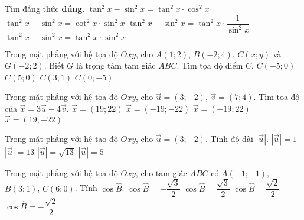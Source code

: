\begin{ex}%
	Tìm đẳng thức \textbf{đúng}.
	\choice
	{$\tan^2 x-\sin^2 x=\tan^2x \cdot \cos^2 x$}
	{$\tan^2 x-\sin^2 x=\cot^2 x\cdot \sin^2 x$}
	{$\tan^2 x-\sin^2 x=\tan^2 x\cdot \dfrac{1}{\sin^2 x}$}
	{\True $\tan^2 x-\sin^2 x=\tan^2x \cdot \sin^2 x$}
\end{ex}
\begin{ex}%
	Trong mặt phẳng với hệ tọa độ $Oxy$, cho $A(1;2)$, $B(-2;4)$, $C(x;y)$ và $G(-2;2)$. Biết $G$ là trọng tâm tam giác $ABC$. Tìm tọa độ điểm $C$.
	\choice
	{\True $C(-5;0)$}
	{$C(5;0)$}
	{$C(3;1)$}
	{$C(0;-5)$}
\end{ex}
\begin{ex}%
	Trong mặt phẳng với hệ tọa độ $Oxy$, cho $\vec{u}=(3;-2)$, $\vec{v}=(7;4)$. Tìm tọa độ của $\vec{x}=3\vec{u}-4\vec{v}$.
	\choice
	{$\vec{x}=(19;22)$}	
	{\True $\vec{x}=(-19;-22)$}
	{$\vec{x}=(-19;22)$}
	{$\vec{x}=(19;-22)$}
\end{ex}
\begin{ex}%
	Trong mặt phẳng với hệ tạo độ $Oxy$, cho $\vec{u}=(3;-2)$. Tính độ dài $|\vec{u}|$.
	\choice
	{$|\vec{u}|=1$}
	{$|\vec{u}|=13$}
	{\True $|\vec{u}|=\sqrt{13}$}
	{$|\vec{u}|=5$}
\end{ex}
\begin{ex}%
	Trong mặt phẳng với hệ tọa độ $Oxy$, cho tam giác $ABC$ có $A(-1;-1)$, $B(3;1)$, $C(6;0)$. Tính $\cos \widehat{B}$.
	\choice
	{$\cos\widehat{B}=-\dfrac{\sqrt{3}}{2}$}
	{$\cos\widehat{B}=\dfrac{\sqrt{3}}{2}$}
	{$\cos\widehat{B}=\dfrac{\sqrt{2}}{2}$}
	{\True $\cos\widehat{B}=-\dfrac{\sqrt{2}}{2}$}
\end{ex}
